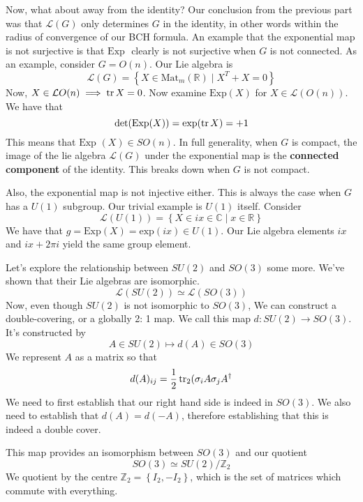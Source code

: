 Now, what about away from the identity? 
Our conclusion from the previous part was that $ \mathcal{ L } ( G ) $ 
only determines $ G $ in the identity, in other words within the 
radius of convergence of our BCH formula. 
An example that the exponential map is not surjective is that 
 $ \text{Exp  } $ clearly is not surjective when $ G $ is not connected. 
 As an example, consider $ G = O ( n ) $. Our Lie algebra is 
 \[
	 \mathcal{ L } ( G )  = \left\{  X \in \text{Mat}_m ( \mathbb{ R }) \mid X^ T + X = 0  \right\} 
 \]   Now, $ X \in \mathcal{ L } O ( n ) \implies \tr X = 0 $. Now 
 examine $ \text{Exp} ( X)  $ for $ X \in \mathcal{ L } ( O ( n ) ) $. 
 We have that 
 \[
	 \det ( \text{Exp} ( X) ) = \text{exp} ( \tr X )  = + 1 
 \] This means that $ \text{Exp } ( X) \in SO ( n ) $. 
 In full generality, when $ G $ is compact, the image of 
 the lie algebra $ \mathcal{ L } ( G ) $ under the exponential map 
 is the \textbf{connected component} of the identity. 
This breaks down when $ G $ is not compact. 

Also, the exponential map is not 
injective either. This is always the case when $ G $ has a $ U ( 1) $ 
subgroup. Our trivial example is $ U ( 1 ) $ itself. 
Consider 
\[
	\mathcal{ L } ( U ( 1) )  = \left\{  X \in i x \in \mathbb{ C} \mid x \in \mathbb{ R}  \right\} 
\] We have that  $ g  = \text{Exp}( X )  = \text{exp}( i x ) \in U ( 1)  $. 
Our Lie algebra elements $ i x $ and $ i x + 2 \pi i $ yield 
the same group element. 

Let's explore the relationship between $ SU ( 2 )  $ and $ SO ( 3  ) $ 
some more. We've shown that their Lie algebras are isomorphic. 
\[
	\mathcal{ L } ( SU ( 2 ) ) \simeq \mathcal{ L } ( SO ( 3) ) 
\] Now, even though $ SU (2 )$ is not isomorphic to $ SO ( 3)$, 
We can construct a double-covering, or a globally 2: 1 map. 
We call this map $ d : SU ( 2 ) \to SO ( 3) $. 
It's constructed by 
 \[
 A \in SU ( 2) \mapsto d ( A ) \in SO ( 3 ) 
\] We represent $ A $ as a matrix so that 
 \[
	 d ( A)_{ ij }  = \frac{1}{2 } \tr_{2 } ( \sigma_i A \sigma_{ j } A^ \dagger 
 \]  We need to first establish that our right hand side is indeed in 
 $ SO ( 3)  $. We also need to establish that 
 $ d ( A )  = d ( - A ) $, therefore establishing that this is 
 indeed a double cover. 

 This map provides an isomorphism between $ SO ( 3)  $ 
 and our quotient 
 \[
  SO ( 3) \simeq SU ( 2 ) / \mathbb{ Z}_2 
 \] We quotient by the centre $ \mathbb { Z} _ 2  = \left\{  I_2 , - I_ 2  \right\}  $, 
 which is the set of matrices which commute with everything. 

